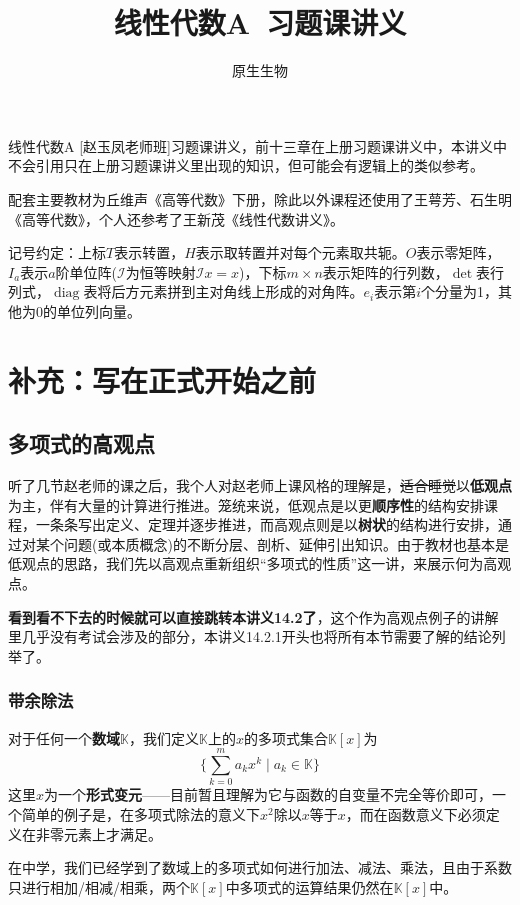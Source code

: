 \documentclass[a4paper,UTF8,fontset=windows,AutoFakeBold]{ctexart}
\title{\textbf{线性代数A\ 习题课讲义}}
\author{原生生物}
\date{}
\DeclareMathOperator{\diag}{diag}
\newcommand*{\mi}{\mathcal{I}}
\newcommand*{\note}{\noindent *}
\begin{document}
\maketitle

\note 线性代数A [赵玉凤老师班]习题课讲义，前十三章在上册习题课讲义中，本讲义中不会引用只在上册习题课讲义里出现的知识，但可能会有逻辑上的类似参考。

\note 配套主要教材为丘维声《高等代数》下册，除此以外课程还使用了王萼芳、石生明《高等代数》，个人还参考了王新茂《线性代数讲义》。

\note 记号约定：上标$T$表示转置，$H$表示取转置并对每个元素取共轭。$O$表示零矩阵，$I_a$表示$a$阶单位阵($\mi$为恒等映射$\mi x=x$)，下标$m\times n$表示矩阵的行列数，$\det$表行列式，$\diag$表将后方元素拼到主对角线上形成的对角阵。$e_i$表示第$i$个分量为1，其他为0的单位列向量。

\tableofcontents

\newpage
\section{补充：写在正式开始之前}
\subsection{多项式的高观点}
听了几节赵老师的课之后，我个人对赵老师上课风格的理解是，\sout{适合睡觉}以\textbf{低观点}为主，伴有大量的计算进行推进。笼统来说，低观点是以更\textbf{顺序性}的结构安排课程，一条条写出定义、定理并逐步推进，而高观点则是以\textbf{树状}的结构进行安排，通过对某个问题(或本质概念)的不断分层、剖析、延伸引出知识。由于教材也基本是低观点的思路，我们先以高观点重新组织``多项式的性质''这一讲，来展示何为高观点。

\note \textbf{看到看不下去的时候就可以直接跳转本讲义14.2了}，这个作为高观点例子的讲解里几乎没有考试会涉及的部分，本讲义14.2.1开头也将所有本节需要了解的结论列举了。

\subsubsection{带余除法}
对于任何一个\textbf{数域}$\mathbb{K}$，我们定义$\mathbb{K}$上的$x$的多项式集合$\mathbb{K}[x]$为
$$\bigg\{\sum_{k=0}^ma_kx^k\mid a_k\in\mathbb{K}\bigg\}$$
这里$x$为一个\textbf{形式变元}——目前暂且理解为它与函数的自变量不完全等价即可，一个简单的例子是，在多项式除法的意义下$x^2$除以$x$等于$x$，而在函数意义下必须定义在非零元素上才满足。

在中学，我们已经学到了数域上的多项式如何进行加法、减法、乘法，且由于系数只进行相加/相减/相乘，两个$\mathbb{K}[x]$中多项式的运算结果仍然在$\mathbb{K}[x]$中。
\end{document}
